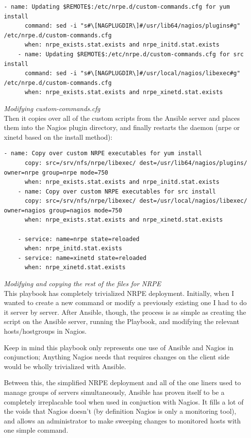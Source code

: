 \documentclass[a4paper]{article}
\begin{document}
\begin{lstlisting}[language=nagconf]
    - name: Updating $REMOTE$:/etc/nrpe.d/custom-commands.cfg for yum install
      command: sed -i "s#\[NAGPLUGDIR\]#/usr/lib64/nagios/plugins#g" /etc/nrpe.d/custom-commands.cfg
      when: nrpe_exists.stat.exists and nrpe_initd.stat.exists
    - name: Updating $REMOTE$:/etc/nrpe.d/custom-commands.cfg for src install
      command: sed -i "s#\[NAGPLUGDIR\]#/usr/local/nagios/libexec#g" /etc/nrpe.d/custom-commands.cfg
      when: nrpe_exists.stat.exists and nrpe_xinetd.stat.exists
\end{lstlisting}
\hfill \textit{Modifying custom-commands.cfg}\\

Then it copies over all of the custom scripts from the Ansible server and places them into the Nagios plugin directory, and finally restarts the daemon (nrpe or xinetd based on the install method):

\begin{lstlisting}[language=nagconf]
    - name: Copy over custom NRPE executables for yum install
      copy: src=/srv/nfs/nrpe/libexec/ dest=/usr/lib64/nagios/plugins/ owner=nrpe group=nrpe mode=750
      when: nrpe_exists.stat.exists and nrpe_initd.stat.exists
    - name: Copy over custom NRPE executables for src install
      copy: src=/srv/nfs/nrpe/libexec/ dest=/usr/local/nagios/libexec/ owner=nagios group=nagios mode=750
      when: nrpe_exists.stat.exists and nrpe_xinetd.stat.exists

    - service: name=nrpe state=reloaded
      when: nrpe_initd.stat.exists
    - service: name=xinetd state=reloaded
      when: nrpe_xinetd.stat.exists
\end{lstlisting}
\hfill \textit{Modifying and copying the rest of the files for NRPE}\\

This playbook has completely trivialized NRPE deployment. Initially, when I wanted to create a new command or modify a previously existing one I had to do it server by server. After Ansible, though, the process is as simple as creating the script on the Ansible server, running the Playbook, and modifying the relevant hosts/hostgroups in Nagios.

Keep in mind this playbook only represents one use of Ansible and Nagios in conjunction; Anything Nagios needs that requires changes on the client side would be wholly trivialized with Ansible.

Between this, the simplified NRPE deployment and all of the one liners used to manage groups of servers simultaneously, Ansible has proven itself to be a completely irreplacable tool when used in conjuction with Nagios. It fills a lot of the voids that Nagios doesn't (by definition Nagios is only a monitoring tool), and allows an administrator to make sweeping changes to monitored hosts with one simple command.
\end{document}
